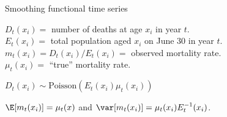 \documentclass[14pt]{beamer}
\begin{document}
\begin{frame}{\large Smoothing functional time series}\vspace*{-0.2cm}


$D_t(x_i)=$ number of deaths at age $x_i$ in year $t$.\\
$E_t(x_i)=$ total population aged $x_i$ on June 30 in year $t$.\\
$m_t(x_i) = D_t(x_i)/E_t(x_i)=$ observed mortality rate.\\
$\mu_t(x_i)=$ ``true'' mortality rate. \pause
\begin{block}{}
\centerline{$D_t(x_i) \sim \mbox{Poisson}(E_t(x_i) \mu_t(x_i))$}
\end{block}
\pause 
$\E[m_t(x_i)] = \mu_t(x)$ and $\var[m_t(x_i)] = \mu_t(x_i)E_t^{-1}(x_i)$.

\vspace*{10cm}

\end{frame}
\end{document}

